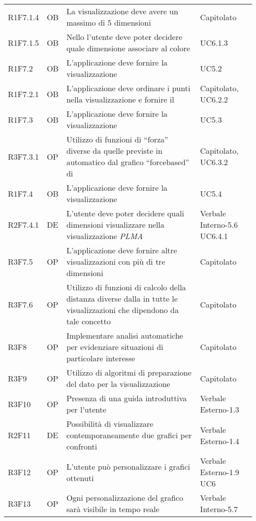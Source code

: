 {\begin{longtable}{C{2cm} | C{1.5cm} | C{9cm} | C{3.3cm}}
R1F7.1.4 & OB & La visualizzazione  deve avere un massimo di 5 dimensioni & Capitolato\\

R1F7.1.5 & OB & Nello  l'utente deve poter decidere quale dimensione associare al colore & UC6.1.3\\

R1F7.2 & OB & L'applicazione deve fornire la visualizzazione  & UC5.2\\
R1F7.2.1 & OB & L'applicazione deve ordinare i punti nella visualizzazione  e fornire il  & Capitolato, UC6.2.2 \\
R1F7.3 & OB & L'applicazione deve fornire la visualizzazione  & UC5.3\\
R3F7.3.1 & OP & Utilizzo di funzioni di “forza” diverse da quelle previste in automatico dal grafico “forcebased” di  & Capitolato, UC6.3.2\\
R1F7.4 & OB & L'applicazione deve fornire la visualizzazione  & UC5.4 \\
R2F7.4.1 & DE & L'utente deve poter decidere quali dimensioni visualizzare nella visualizzazione \textit{PLMA} & Verbale Interno-5.6 \newline UC6.4.1\\
R3F7.5 & OP & L'applicazione deve fornire altre visualizzazioni con più di tre dimensioni & Capitolato\\
R3F7.6 & OP & Utilizzo di funzioni di calcolo della distanza diverse dalla  in tutte le visualizzazioni che dipendono da tale concetto & Capitolato \\
R3F8 & OP & Implementare analisi automatiche per evidenziare situazioni di particolare interesse & Capitolato\\
R3F9 & OP & Utilizzo di algoritmi di preparazione del dato per la visualizzazione & Capitolato\\
R3F10 & OP & Presenza di una guida introduttiva per l'utente & Verbale Esterno-1.3\\
R2F11 & DE & Possibilità di visualizzare contemporaneamente due grafici per confronti & Verbale Esterno-1.4\\
R3F12 & OP & L'utente può personalizzare i grafici ottenuti & Verbale Esterno-1.9 \newline UC6 \\
R3F13 & OP & Ogni personalizzazione del grafico sarà visibile in tempo reale & Verbale Interno-5.7 \\

\end{longtable}}

